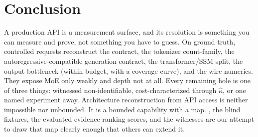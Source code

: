 \section{Conclusion}
\label{sec:conclusion}
A production API is a measurement surface, and its resolution is something you can
measure and prove, not something you have to guess.  On ground truth, controlled
requests reconstruct the contract, the tokenizer count-family, the
autoregressive-compatible generation contract, the transformer/SSM split, the output
bottleneck (within budget, with a coverage curve), and the wire numerics.  They expose
MoE only weakly and depth not at all.  Every remaining hole is one of three things:
witnessed non-identifiable, cost-characterized through $\hat\kappa$, or one named
experiment away.  Architecture reconstruction from API access is neither impossible nor
unbounded.  It is a bounded capability with a map.  \benchname{}, the blind fixtures,
the evaluated evidence-ranking scores, and the witnesses are our attempt to draw that
map clearly enough that others can extend it.
